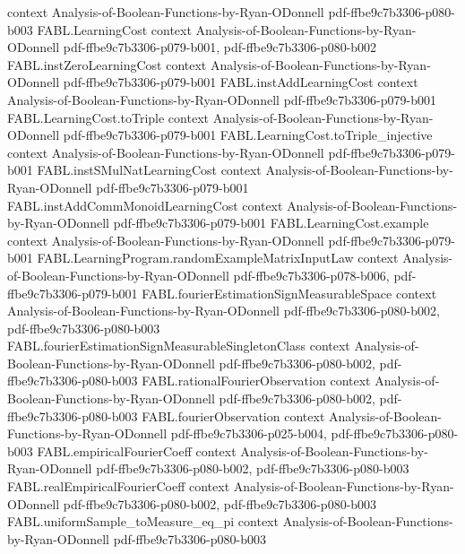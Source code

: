 \begin{theorem}
  {context}
  {Analysis-of-Boolean-Functions-by-Ryan-ODonnell}
  {pdf-ffbe9c7b3306-p080-b003}
\proofstep
  {FABL.LearningCost}
  {context}
  {Analysis-of-Boolean-Functions-by-Ryan-ODonnell}
  {pdf-ffbe9c7b3306-p079-b001,
    pdf-ffbe9c7b3306-p080-b002}
\proofstep
  {FABL.instZeroLearningCost}
  {context}
  {Analysis-of-Boolean-Functions-by-Ryan-ODonnell}
  {pdf-ffbe9c7b3306-p079-b001}
\proofstep
  {FABL.instAddLearningCost}
  {context}
  {Analysis-of-Boolean-Functions-by-Ryan-ODonnell}
  {pdf-ffbe9c7b3306-p079-b001}
\proofstep
  {FABL.LearningCost.toTriple}
  {context}
  {Analysis-of-Boolean-Functions-by-Ryan-ODonnell}
  {pdf-ffbe9c7b3306-p079-b001}
\proofstep
  {FABL.LearningCost.toTriple_injective}
  {context}
  {Analysis-of-Boolean-Functions-by-Ryan-ODonnell}
  {pdf-ffbe9c7b3306-p079-b001}
\proofstep
  {FABL.instSMulNatLearningCost}
  {context}
  {Analysis-of-Boolean-Functions-by-Ryan-ODonnell}
  {pdf-ffbe9c7b3306-p079-b001}
\proofstep
  {FABL.instAddCommMonoidLearningCost}
  {context}
  {Analysis-of-Boolean-Functions-by-Ryan-ODonnell}
  {pdf-ffbe9c7b3306-p079-b001}
\proofstep
  {FABL.LearningCost.example}
  {context}
  {Analysis-of-Boolean-Functions-by-Ryan-ODonnell}
  {pdf-ffbe9c7b3306-p079-b001}
\proofstep
  {FABL.LearningProgram.randomExampleMatrixInputLaw}
  {context}
  {Analysis-of-Boolean-Functions-by-Ryan-ODonnell}
  {pdf-ffbe9c7b3306-p078-b006,
    pdf-ffbe9c7b3306-p079-b001}
\proofstep
  {FABL.fourierEstimationSignMeasurableSpace}
  {context}
  {Analysis-of-Boolean-Functions-by-Ryan-ODonnell}
  {pdf-ffbe9c7b3306-p080-b002,
    pdf-ffbe9c7b3306-p080-b003}
\proofstep
  {FABL.fourierEstimationSignMeasurableSingletonClass}
  {context}
  {Analysis-of-Boolean-Functions-by-Ryan-ODonnell}
  {pdf-ffbe9c7b3306-p080-b002,
    pdf-ffbe9c7b3306-p080-b003}
\proofstep
  {FABL.rationalFourierObservation}
  {context}
  {Analysis-of-Boolean-Functions-by-Ryan-ODonnell}
  {pdf-ffbe9c7b3306-p080-b002,
    pdf-ffbe9c7b3306-p080-b003}
\proofstep
  {FABL.fourierObservation}
  {context}
  {Analysis-of-Boolean-Functions-by-Ryan-ODonnell}
  {pdf-ffbe9c7b3306-p025-b004,
    pdf-ffbe9c7b3306-p080-b003}
\proofstep
  {FABL.empiricalFourierCoeff}
  {context}
  {Analysis-of-Boolean-Functions-by-Ryan-ODonnell}
  {pdf-ffbe9c7b3306-p080-b002,
    pdf-ffbe9c7b3306-p080-b003}
\proofstep
  {FABL.realEmpiricalFourierCoeff}
  {context}
  {Analysis-of-Boolean-Functions-by-Ryan-ODonnell}
  {pdf-ffbe9c7b3306-p080-b002,
    pdf-ffbe9c7b3306-p080-b003}
\proofstep
  {FABL.uniformSample_toMeasure_eq_pi}
  {context}
  {Analysis-of-Boolean-Functions-by-Ryan-ODonnell}
  {pdf-ffbe9c7b3306-p080-b003}

\end{theorem}
